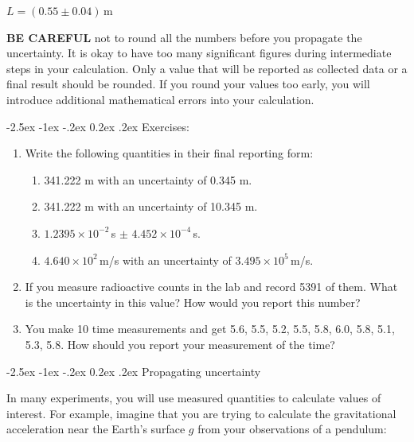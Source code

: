 \documentclass[11pt]{article}
\makeatletter
\renewcommand\u[2][]{\ensuremath{\,\text{#2}^{#1}}}
\renewcommand\section{\@startsection {section}{1}{\z@}%
     {-2.5ex \@plus -1ex \@minus -.2ex}%
     {0.2ex \@plus.2ex}%
    {\bfseries\Large}}
\renewcommand\subsection{\@startsection {subsection}{2}{\z@}%
     {-2.5ex \@plus -1ex \@minus -.2ex}%
     {0.2ex \@plus.2ex}%
    {\bfseries\large}}
\makeatother
\begin{document}
$L = (0.55 \pm 0.04)\u{m}$

\textbf{BE CAREFUL} not to round all the numbers before you propagate the 
uncertainty. It is okay to have too many significant figures during 
intermediate steps in your calculation. Only a value that will be reported as 
collected data or a final result should be rounded. If you round your values too 
early, you will introduce additional mathematical errors into your calculation.

\subsection{Exercises:}

\begin{enumerate}
\item Write the following quantities in their final reporting form:
  \begin{enumerate}
  \item 341.222 m with an uncertainty of 0.345 m.
  \item 341.222 m with an uncertainty of 10.345 m.
  \item $1.2395\times10^{-2}\,$s $\pm$ $4.452\times10^{-4}\,$s.
  \item $4.640\times10^2\,$m/s with an uncertainty of $3.495\times10^5\,$m/s.
  \end{enumerate}

\item If you measure radioactive counts in the lab and record 5391 of them. What
  is the uncertainty in this value? How would you report this number?

\item You make 10 time measurements and get 5.6, 5.5, 5.2, 5.5, 5.8, 6.0, 5.8,
  5.1, 5.3, 5.8. How should you report your measurement of the time? %
\end{enumerate}

\section{Propagating uncertainty}

In many experiments, you will use measured quantities to calculate values of
interest. For example, imagine that you are trying to calculate the
gravitational acceleration near the Earth's surface $g$ from your observations
of a pendulum:
\end{document}
